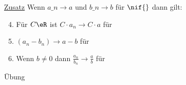 \ul{Zusatz} Wenn $a\_n→a$ und $b\_n→b$ für $\nif{}$ dann gilt:
\begin{enumerate}
\setcounter{enumi}{3}
\item{Für $C\eR$ ist $C·a_n→C·a$ für \nif }%
\item{$(a_n-b_n)→a-b$ für \nif}
\item{Wenn $b\neq 0$ dann $\frac{a_n}{b_n}→\frac{a}{b}$ für \nif}
\end{enumerate}
\bew
Übung